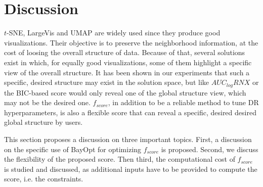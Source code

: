 \section{Discussion}\label{sec:discussion}

$t$-SNE, LargeVis and UMAP are widely used since they produce good visualizations.
Their objective is to preserve the neighborhood information, at the cost of loosing the overall structure of data.
Because of that, several solutions exist in which, for equally good visualizations, some of them highlight a specific view of the overall structure.
It has been shown in our experiments that such a specific, desired structure may exist in the solution space, but like $AUC_{log}RNX$ or the BIC-based score would only reveal one of the global structure view, which may not be the desired one.
$f_{score}$, in addition to be a reliable method to tune DR hyperparameters, is also a flexible score that can reveal a specific, desired desired global structure by users.

This section proposes a discussion on three important topics. First, a discussion on the specific use of BayOpt for optimizing $f_{score}$ is proposed. Second, we discuss the flexibility of the proposed score. Then third, the computational cost of $f_{score}$ is studied and discussed, as additional inputs have to be provided to compute the score, i.e. the constraints.

